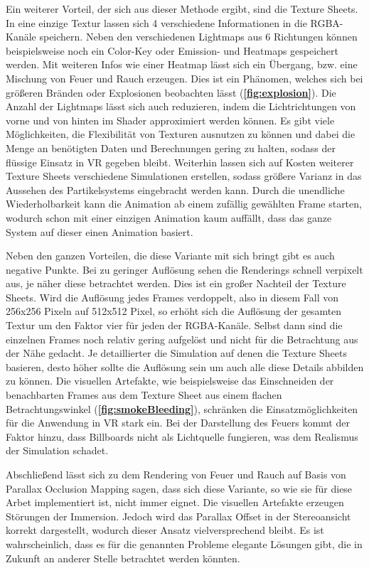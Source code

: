 Ein weiterer Vorteil, der sich aus dieser Methode ergibt, sind die Texture Sheets. In eine einzige Textur lassen sich 4 verschiedene Informationen in die
RGBA-Kanäle speichern. Neben den verschiedenen Lightmaps aus 6 Richtungen können beispielsweise noch ein Color-Key oder Emission- und Heatmaps gespeichert werden.
Mit weiteren Infos wie einer Heatmap lässt sich ein Übergang, bzw. eine Mischung von Feuer und Rauch erzeugen. Dies ist ein Phänomen, welches sich bei größeren Bränden
oder Explosionen beobachten lässt (\textbf{\autoref{fig:explosion}}).
Die Anzahl der Lightmaps lässt sich auch reduzieren, indem die Lichtrichtungen von vorne und von hinten im Shader approximiert werden können.
Es gibt viele Möglichkeiten, die Flexibilität von Texturen ausnutzen zu können und dabei die Menge an benötigten Daten und Berechnungen gering zu halten,
sodass der flüssige Einsatz in VR gegeben bleibt. Weiterhin lassen sich auf Kosten weiterer Texture Sheets
verschiedene Simulationen erstellen, sodass größere Varianz in das Aussehen des Partikelsystems eingebracht werden kann.
Durch die unendliche Wiederholbarkeit kann die Animation ab einem zufällig gewählten Frame starten, wodurch schon mit einer einzigen Animation
kaum auffällt, dass das ganze System auf dieser einen Animation basiert.


Neben den ganzen Vorteilen, die diese Variante mit sich bringt gibt es auch negative Punkte. Bei zu geringer Auflösung sehen die Renderings schnell
verpixelt aus, je näher diese betrachtet werden. Dies ist ein großer Nachteil der Texture Sheets. Wird die Auflösung jedes Frames verdoppelt, also in diesem
Fall von 256x256 Pixeln auf 512x512 Pixel, so erhöht sich die Auflösung der gesamten Textur um den Faktor vier für jeden der RGBA-Kanäle. Selbst dann sind
die einzelnen Frames noch relativ gering aufgelöst und nicht für die Betrachtung aus der Nähe gedacht. Je detaillierter die Simulation auf denen die Texture Sheets basieren,
desto höher sollte die Auflösung sein um auch alle diese Details abbilden zu können.
Die visuellen Artefakte, wie beispielsweise das Einschneiden der benachbarten Frames aus dem Texture Sheet aus einem flachen Betrachtungswinkel (\textbf{\autoref{fig:smokeBleeding}}),
schränken die Einsatzmöglichkeiten für die Anwendung in VR stark ein.
Bei der Darstellung des Feuers kommt der Faktor hinzu, dass Billboards nicht als Lichtquelle fungieren, was dem Realismus der Simulation schadet.

Abschließend lässt sich zu dem Rendering von Feuer und Rauch auf Basis von Parallax Occlusion Mapping sagen, dass sich diese Variante, so wie sie für diese Arbet
implementiert ist, nicht immer eignet. Die visuellen Artefakte erzeugen Störungen der Immersion. Jedoch wird das Parallax Offset in der Stereoansicht korrekt dargestellt,
wodurch dieser Ansatz vielversprechend bleibt. Es ist wahrscheinlich, dass es für die genannten Probleme elegante Lösungen gibt, die in Zukunft an anderer Stelle 
betrachtet werden könnten.




